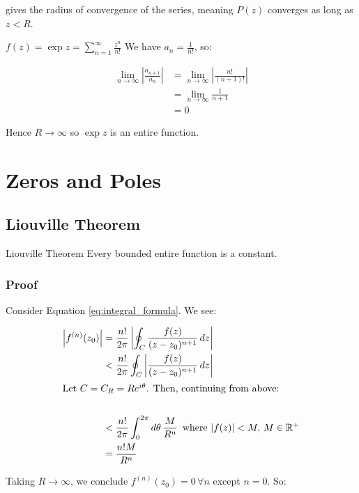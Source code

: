 \documentclass{physics_notes}
\begin{document}
gives the radius of convergence of the series, meaning $P(z)$ converges as long as $z < R$.

\begin{example}{$f(z) = \exp{z} = \sum_{n=1}^\infty \frac{z^n}{n!}$}
We have $a_n = \frac{1}{n!}$, so:

\begin{align*} 
\lim_{n\to\infty} \left|\frac{a_{n+1}}{a_n}\right| &= \lim_{n\to\infty} \left|\frac{n!}{(n+1)!}\right| \\
&= \lim_{n\to\infty} \frac{1}{n+1} \\
&= 0
\end{align*}

Hence $R \longrightarrow \infty$ so $\exp{z}$ is an entire function.
\end{example}

\section{Zeros and Poles}
\subsection{Liouville Theorem}

\begin{theorem}{Liouville Theorem}
Every bounded entire function is a constant.
\end{theorem}

\subsubsection*{Proof}

Consider Equation \ref{eq:integral_formula}. We see:

\begin{align*}
\left|f^{(n)}(z_0)\right| &= \frac{n!}{2\pi}\left|\oint_C \frac{f(z)}{(z-z_0)^{n+1}}\, dz\right| \\
&< \frac{n!}{2\pi}\oint_C \left| \frac{f(z)}{(z-z_0)^{n+1}}\, dz\right| \\
\intertext{Let $C = C_R = Re^{i\theta}$. Then, continuing from above:} \\
&< \frac{n!}{2\pi}\int_0^{2\pi} d\theta \, \frac{M}{R^n} \, \text{ where $|f(z)| < M, \, M\in \mathbb{R}^{+}$} \\
&= \frac{n!M}{R^n}
\end{align*}

Taking $R\to\infty$, we conclude $f^{(n)}(z_0) = 0 \, \forall n$ except $n=0$. So:
\end{document}
